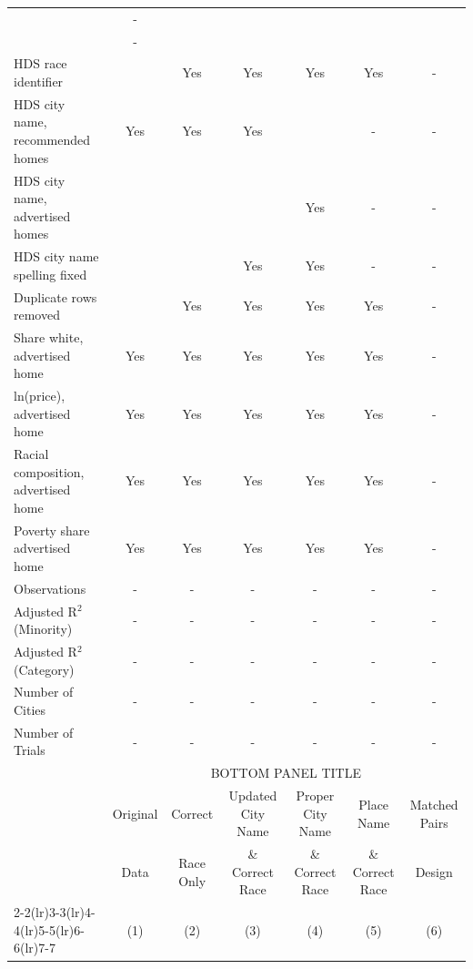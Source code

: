 \begin{table}[htbp]
{\begin{tabular}{l*{6}{c}}
                    &   -   &       &     &      &      &  \\
                    & -   &    &    &   &   &  \\
\midrule
HDS race identifier & & Yes & Yes & Yes & Yes & - \\
HDS city name, recommended homes & Yes & Yes & Yes & & - & -\\
HDS city name, advertised homes &  &  &  & Yes & - & -\\
HDS city name spelling fixed & & & Yes & Yes & - & -\\
Duplicate rows removed &  & Yes & Yes & Yes & Yes & - \\
\midrule
Share white, advertised home  & Yes & Yes & Yes & Yes & Yes & - \\
ln(price), advertised home  & Yes & Yes & Yes & Yes & Yes & - \\
Racial composition, advertised home & Yes & Yes & Yes & Yes & Yes & - \\
Poverty share advertised home & Yes & Yes & Yes & Yes & Yes & - \\
Observations        &        -   &        -   &        -   &        -   &        -   & - \\
Adjusted R$^2$ (Minority)    &     -   &     -   &     -   &     -   &     -   & - \\
Adjusted R$^2$ (Category)     &     -   &     -   &     -   &     -   &     -   & - \\
Number of Cities    &        -   &        -   &         -   &         -   &         -   & - \\
Number of Trials & - & - & - & - & - & - \\
\bottomrule
\toprule
& \multicolumn{6}{c}{BOTTOM PANEL TITLE}\\
\toprule
                    &\multicolumn{1}{c}{Original}&\multicolumn{1}{c}{Correct}&\multicolumn{1}{c}{Updated City Name}&\multicolumn{1}{c}{Proper City Name}&\multicolumn{1}{c}{Place Name}&\multicolumn{1}{c}{Matched Pairs}\\
                      &\multicolumn{1}{c}{Data}&\multicolumn{1}{c}{Race Only}&\multicolumn{1}{c}{\& Correct Race}&\multicolumn{1}{c}{\& Correct Race}&\multicolumn{1}{c}{\& Correct Race}&\multicolumn{1}{c}{Design}\\                  
                    \cmidrule(lr){2-2}\cmidrule(lr){3-3}\cmidrule(lr){4-4}\cmidrule(lr){5-5}\cmidrule(lr){6-6}\cmidrule(lr){7-7}
                    &\multicolumn{1}{c}{(1)}   &\multicolumn{1}{c}{(2)}   &\multicolumn{1}{c}{(3)}   &\multicolumn{1}{c}{(4)}   &\multicolumn{1}{c}{(5)}   &\multicolumn{1}{c}{(6)}\\

\end{tabular}}
\end{table}
